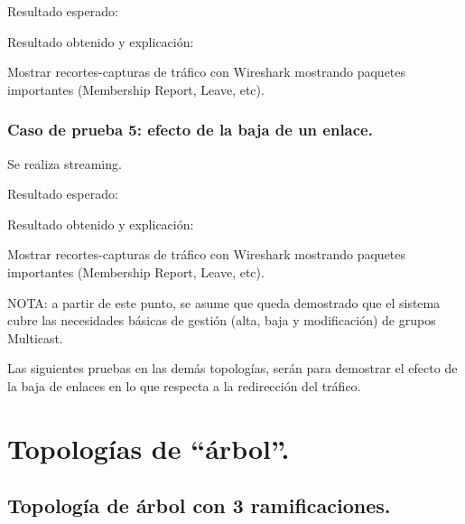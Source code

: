 \documentclass[12pt,a4paper,oneside]{book}
\begin{document}
\vspace{0.5cm}
Resultado esperado: 

\vspace{0.5cm}
Resultado obtenido y explicación: 

\vspace{0.5cm}
Mostrar recortes-capturas de tráfico con Wireshark mostrando paquetes importantes (Membership Report, Leave, etc).

\subsubsection{Caso de prueba 5: efecto de la baja de un enlace.} 
Se realiza streaming.

\vspace{0.5cm}
Resultado esperado: 

\vspace{0.5cm}
Resultado obtenido y explicación: 

\vspace{0.5cm}
Mostrar recortes-capturas de tráfico con Wireshark mostrando paquetes importantes (Membership Report, Leave, etc).

\vspace{0.5cm}
NOTA: a partir de este punto, se asume que queda demostrado que el sistema cubre las necesidades básicas de gestión (alta, baja y modificación) de grupos Multicast.

\vspace{0.5cm}
Las siguientes pruebas en las demás topologías, serán para demostrar el efecto de la baja de enlaces en lo que respecta a la redirección del tráfico.


\section{Topologías de ``árbol''.}

\subsection{Topología de árbol con 3 ramificaciones.}
\end{document}

